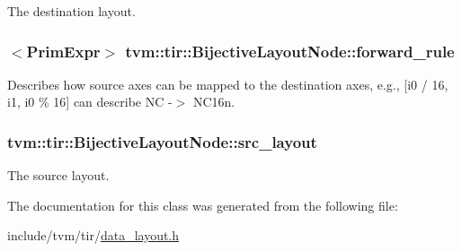 The destination layout. 

\subsubsection[{\texorpdfstring{forward\+\_\+rule}{forward_rule}}]{$<${\bf Prim\+Expr}$>$ tvm\+::tir\+::\+Bijective\+Layout\+Node\+::forward\+\_\+rule}\hypertarget{classtvm_1_1tir_1_1BijectiveLayoutNode_a21eb51d30c60622b38aec8a0953fd763}{}\label{classtvm_1_1tir_1_1BijectiveLayoutNode_a21eb51d30c60622b38aec8a0953fd763}


Describes how source axes can be mapped to the destination axes, e.\+g., \mbox{[}i0 / 16, i1, i0 \% 16\mbox{]} can describe NC -\/$>$ N\+C16n. 

\subsubsection[{\texorpdfstring{src\+\_\+layout}{src_layout}}]{ tvm\+::tir\+::\+Bijective\+Layout\+Node\+::src\+\_\+layout}\hypertarget{classtvm_1_1tir_1_1BijectiveLayoutNode_a265fb704868822f0cdd00146353020d0}{}\label{classtvm_1_1tir_1_1BijectiveLayoutNode_a265fb704868822f0cdd00146353020d0}


The source layout. 



The documentation for this class was generated from the following file\+:\begin{DoxyCompactItemize}
\item 
include/tvm/tir/\hyperlink{data__layout_8h}{data\+\_\+layout.\+h}\end{DoxyCompactItemize}
